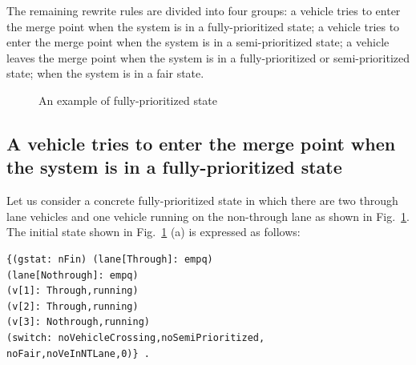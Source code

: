 \documentclass[10pt, conference, compsocconf]{IEEEtran}
\begin{document}
The remaining rewrite rules are divided into four groups: a vehicle tries to enter the merge point when the system is in a fully-prioritized state; a vehicle tries to enter the merge point when the system is in a semi-prioritized state; a vehicle leaves the merge point when the system is in a fully-prioritized or semi-prioritized state;
when the system is in a fair state.
	
\begin{figure}[tb]
\begin{center}
\end{center}
\caption{An example of fully-prioritized state}
\label{fully_fig}
\end{figure}

\subsection{A vehicle tries to enter the merge point when the system is in a fully-prioritized state}

Let us consider a concrete fully-prioritized state in which there are two through lane vehicles and one vehicle running on the non-through lane as shown in Fig.~\ref{fully_fig}. 
The initial state shown in Fig.~\ref{fully_fig} (a) is expressed as follows:
 
\begin{small}
\begin{verbatim}
{(gstat: nFin) (lane[Through]: empq) 
(lane[Nothrough]: empq) 
(v[1]: Through,running) 
(v[2]: Through,running)
(v[3]: Nothrough,running)
(switch: noVehicleCrossing,noSemiPrioritized,
noFair,noVeInNTLane,0)} .
\end{verbatim}
\end{small}
\end{document}
